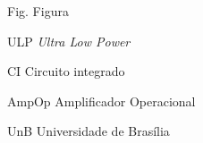 \begin{siglas}
  \item[Fig.] Figura
  \item[ULP] \textit{Ultra Low Power}
  \item[CI] Circuito integrado
  \item[AmpOp] Amplificador Operacional
  \item[UnB] Universidade de Brasília
\end{siglas}
